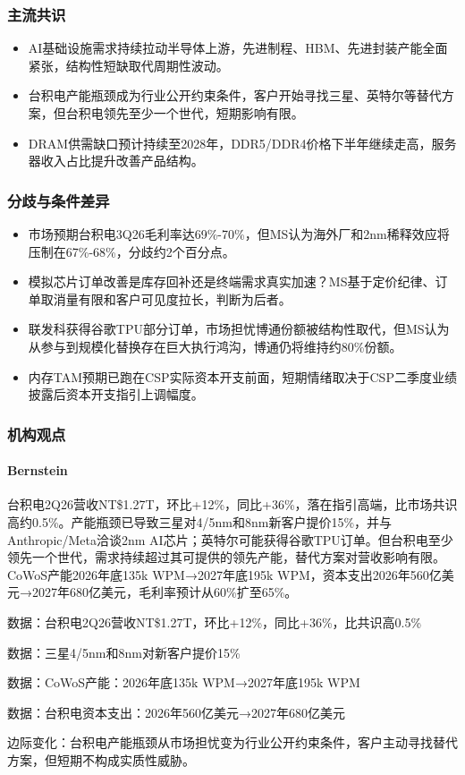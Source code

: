 \documentclass[11pt]{ctexart}
\begin{document}
\subsubsection*{主流共识}
\begin{itemize}
  \item AI基础设施需求持续拉动半导体上游，先进制程、HBM、先进封装产能全面紧张，结构性短缺取代周期性波动。
  \item 台积电产能瓶颈成为行业公开约束条件，客户开始寻找三星、英特尔等替代方案，但台积电领先至少一个世代，短期影响有限。
  \item DRAM供需缺口预计持续至2028年，DDR5/DDR4价格下半年继续走高，服务器收入占比提升改善产品结构。
\end{itemize}
\subsubsection*{分歧与条件差异}
\begin{itemize}
  \item 市场预期台积电3Q26毛利率达69\%-70\%，但MS认为海外厂和2nm稀释效应将压制在67\%-68\%，分歧约2个百分点。
  \item 模拟芯片订单改善是库存回补还是终端需求真实加速？MS基于定价纪律、订单取消量有限和客户可见度拉长，判断为后者。
  \item 联发科获得谷歌TPU部分订单，市场担忧博通份额被结构性取代，但MS认为从参与到规模化替换存在巨大执行鸿沟，博通仍将维持约80\%份额。
  \item 内存TAM预期已跑在CSP实际资本开支前面，短期情绪取决于CSP二季度业绩披露后资本开支指引上调幅度。
\end{itemize}
\subsubsection*{机构观点}
\paragraph{Bernstein} 台积电2Q26营收NT\$1.27T，环比+12\%，同比+36\%，落在指引高端，比市场共识高约0.5\%。产能瓶颈已导致三星对4/5nm和8nm新客户提价15\%，并与Anthropic/Meta洽谈2nm AI芯片；英特尔可能获得谷歌TPU订单。但台积电至少领先一个世代，需求持续超过其可提供的领先产能，替代方案对营收影响有限。CoWoS产能2026年底135k WPM→2027年底195k WPM，资本支出2026年560亿美元→2027年680亿美元，毛利率预计从60\%扩至65\%。
{\small\color{refgray}数据：台积电2Q26营收NT\$1.27T，环比+12\%，同比+36\%，比共识高0.5\%\par}
{\small\color{refgray}数据：三星4/5nm和8nm对新客户提价15\%\par}
{\small\color{refgray}数据：CoWoS产能：2026年底135k WPM→2027年底195k WPM\par}
{\small\color{refgray}数据：台积电资本支出：2026年560亿美元→2027年680亿美元\par}
{\small\color{refgray}边际变化：台积电产能瓶颈从市场担忧变为行业公开约束条件，客户主动寻找替代方案，但短期不构成实质性威胁。\par}
\end{document}

